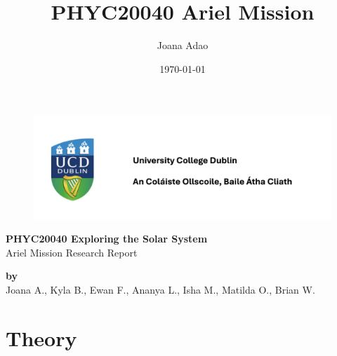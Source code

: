 \documentclass[12pt]{article}
\title{PHYC20040 Ariel Mission}
\author{Joana Adao}
\date{\today}
\begin{document}
\begin{titlepage}
    \begin{figure}[H]
        \includegraphics[width=.8\textwidth]{UCDLogo.png}
    \end{figure}

    \begin{center}
        \vspace{5cm}

        {\LARGE \bfseries PHYC20040 Exploring the Solar System}\\
        \vspace{0.75cm}
        {\Large Ariel Mission Research Report}
        
        \vspace{1cm}
    

    \vspace{2cm}
    
    {\large \textbf{by}}\\
    \vspace{.5cm}
    {\large Joana A., Kyla B., Ewan F., Ananya L., Isha M., Matilda O., Brian W.}\\

    \end{center}
    
   \clearpage

\end{titlepage}

\setcounter{page}{1}
\tableofcontents
{}

\newpage

\begin{abstract}



 
\end{abstract}


\vspace{4.5cm}

\section{Theory} \label{sec:1}
\end{document}
